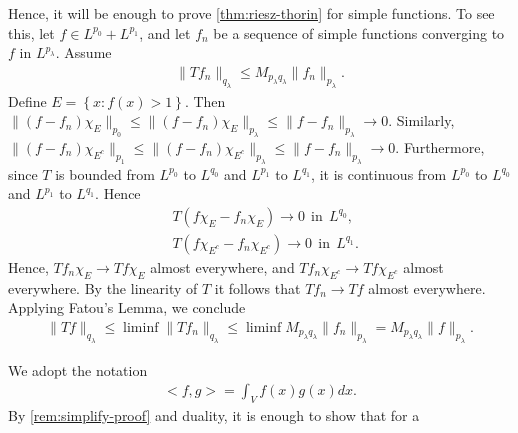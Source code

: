 \begin{framed}
\begin{remark}
\label{rem:simplify-proof}
Hence, it will be enough to prove \autoref{thm:riesz-thorin} for simple
functions. To see this, let $f \in L^{p_0} + L^{p_1}$, and let $f_n$ be a
sequence of simple functions converging to $f$ in $L^{p_\lambda}$. Assume
%
%
\begin{equation*}
	\begin{split}
		\| Tf_{n} \|_{q_\lambda} \le M_{p_\lambda q_\lambda} \| f_n \|_{p_\lambda}.
	\end{split}
\end{equation*}
%
%
Define $E = \left\{ x: f(x) >1 \right\}$. Then $\|(f -f_n)\chi_{E}\|_{p_0} \le
\| (f - f_n) \chi_{E} \|_{p_\lambda} \le \| f -f_n \|_{p_\lambda} \to 0$. Similarly,
$\|(f -f_n) \chi_{E^c}\|_{p_1} \le  \|(f -f_n) \chi_{E^c} \|_{p_\lambda} \le \|f -f_n
\|_{p_\lambda} \to 0$. Furthermore, since $T$ is bounded from $L^{p_0}$ to
$L^{q_0}$ and $L^{p_1}$ to $L^{q_1}$, it is continuous from $L^{p_0}$ to
$L^{q_0}$ and $L^{p_1}$ to $L^{q_1}$. Hence
%
%
\begin{equation*}
	\begin{split}
		& T(f\chi_{E} - f_n \chi_{E}) \to 0  \ \ \text{in} \ \ L^{q_0},
		\\
		&  T(f\chi_{E^c} - f_n \chi_{E^c}) \to 0 \ \ \text{in} \ \ L^{q_1}.
	\end{split}
\end{equation*}
%
%
Hence, $Tf_n \chi_{E} \to Tf \chi_{E}$ almost everywhere, and $Tf_n
\chi_{E^c} \to Tf \chi_{E^c}$ almost everywhere. By the linearity of
$T$ it follows that $Tf_n \to Tf$ almost
everywhere. Applying Fatou's Lemma, we conclude
%
%
%
%
\begin{equation*}
	\begin{split}
		\|Tf\|_{q_\lambda} \le \liminf \| Tf_n \|_{q_\lambda} \le \liminf M_{p_\lambda q_\lambda} \| f_n
		\|_{p_\lambda} = M_{p_\lambda q_\lambda} \| f \|_{p_\lambda}.
	\end{split}
\end{equation*}
\end{remark}
\end{framed}
%
%
We adopt the notation
%
%
\begin{equation*}
\begin{split}
<f, g> = \int_{V}f(x)g(x)dx.
\end{split}
\end{equation*}
%
%
By \autoref{rem:simplify-proof} and duality, it is enough to show that for a
